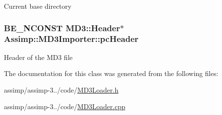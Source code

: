 Current base directory \hypertarget{class_assimp_1_1_m_d3_importer_ad152f22b3af1dcedbc70fb818ab64d26}{
\subsubsection[{pc\+Header}]{\setlength{\rightskip}{0pt plus 5cm}B\+E\+\_\+\+N\+C\+O\+N\+S\+T {\bf M\+D3\+::\+Header}$\ast$ Assimp\+::\+M\+D3\+Importer\+::pc\+Header\hspace{0.3cm}{\ttfamily [protected]}}}\label{class_assimp_1_1_m_d3_importer_ad152f22b3af1dcedbc70fb818ab64d26}
Header of the M\+D3 file 

The documentation for this class was generated from the following files\+:\begin{DoxyCompactItemize}
\item 
assimp/assimp-\/3../code/\hyperlink{_m_d3_loader_8h}{M\+D3\+Loader.\+h}\item 
assimp/assimp-\/3../code/\hyperlink{_m_d3_loader_8cpp}{M\+D3\+Loader.\+cpp}\end{DoxyCompactItemize}
